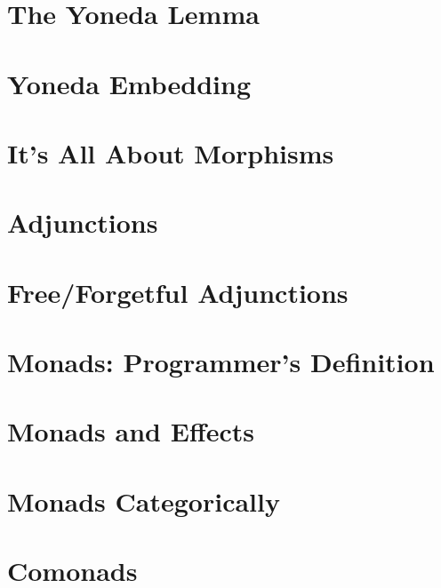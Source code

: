 \chapter{The Yoneda Lemma}\label{the-yoneda-lemma}


\chapter{Yoneda Embedding}\label{yoneda-embedding}



\chapter{It's All About Morphisms}\label{all-about-morphisms}


\chapter{Adjunctions}\label{adjunctions}


\chapter{Free/Forgetful Adjunctions}\label{free-forgetful-adjunctions}


\chapter{Monads: Programmer's Definition}\label{monads-programmers-definition}


\chapter{Monads and Effects}\label{monads-and-effects}


\chapter{Monads Categorically}\label{monads-categorically}


\chapter{Comonads}\label{comonads}


